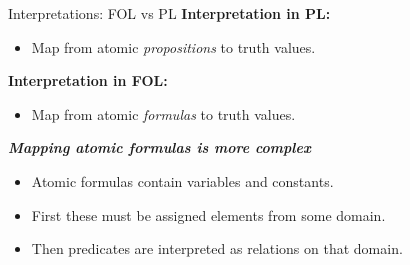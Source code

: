\begin{slide}[bm=,toc=]{Interpretations: FOL vs PL}
{\bf Interpretation in PL:}
\begin{itemize}
\item Map from atomic \emph{propositions} to truth values.
\end{itemize}
\pause
{\bf Interpretation in FOL:} 
\begin{itemize}
\item Map from atomic \emph{formulas} to truth values.
\end{itemize}
\vspace{1ex}
\pause
{\bf \emph{Mapping atomic formulas is more complex}}
\begin{itemize}
\item Atomic formulas contain variables and constants.
\item First these must be assigned elements from some domain.
\item Then predicates are interpreted as relations on that domain. 
\end{itemize}
\end{slide}

